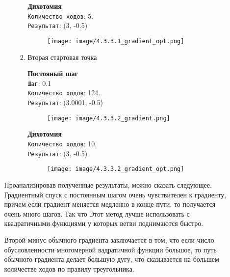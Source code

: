 \documentclass[12pt, a4paper]{article}
\begin{document}
\begin{enumerate}
\begin{enumerate}
\begin{enumerate}
\begin{enumerate}
            \textbf{Дихотомия}\\
            \texttt{Количество ходов}: 5.\\
            \texttt{Результат}: (3, -0.5)
            
            \begin{figure}[h]
            \centering
            \texttt{[image: image/4.3.3.1\_gradient\_opt.png]}
            \end{figure}
            
            \item Вторая стартовая точка

            \textbf{Постояный шаг}\\
            \texttt{Шаг}: 0.1\\
            \texttt{Количество ходов}: 124.\\
            \texttt{Результат}: (3.0001, -0.5)
            
            \begin{figure}[h]
            \centering
            \texttt{[image: image/4.3.3.2\_gradient.png]}
            \end{figure}

            \textbf{Дихотомия}\\
            \texttt{Количество ходов}: 10.\\
            \texttt{Результат}: (3, -0.5)
            
            \begin{figure}[h]
            \centering
            \texttt{[image: image/4.3.3.2\_gradient\_opt.png]}
            \end{figure}
            
        \end{enumerate}
    \end{enumerate}

    Проанализировав полученные результаты, можно сказать следующее. Градиентный спуск с постоянным шагом очень чувствителен к градиенту, причем если градиент меняется медленно в конце пути, то получается очень много шагов. Так что Этот метод лучше использовать с квадратичными функциями у которых ветви поднимаются быстро.

    Второй минус обычного градиента заключается в том, что если число обусловленности многомерной вадратичной функции большое, то путь обычного градиента делает большую дугу, что сказывается на большем количестве ходов по правилу треугольника.


\end{enumerate}
\end{enumerate}
\end{document}
